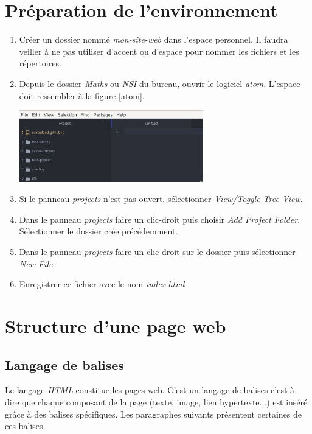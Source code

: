 \documentclass[a4paper,11pt]{article}
\begin{document}
\begin{Form}
\section{Préparation de l'environnement}
\begin{activite}
\begin{enumerate}
\item Créer un dossier nommé \emph{mon-site-web} dans l'espace personnel. Il faudra veiller à ne pas utiliser d'accent ou d'espace pour nommer les fichiers et les répertoires.
\item Depuis le dossier \emph{Maths} ou \emph{NSI} du bureau, ouvrir le logiciel \emph{atom}. L'espace doit ressembler à la figure \ref{atom}.
\begin{center}
\includegraphics[width=8cm]{ressources/atom.png}
\label{atom}
\end{center}
\item Si le panneau \emph{projects} n'est pas ouvert, sélectionner \emph{View/Toggle Tree View}.
\item Dans le panneau \emph{projects} faire un clic-droit puis choisir \emph{Add Project Folder}. Sélectionner le dossier crée précédemment.
\item Dans le panneau \emph{projects} faire un clic-droit sur le dossier puis sélectionner \emph{New File}.
\item Enregistrer ce fichier avec le nom \emph{index.html}
\end{enumerate}
\end{activite}

\section{Structure d'une page web}
\subsection{Langage de balises}
Le langage \emph{HTML} constitue les pages web. C'est un langage de balises c'est à dire que chaque composant de la page (texte, image, lien hypertexte...) est inséré grâce à des balises spécifiques. Les paragraphes suivants présentent certaines de ces balises.

\end{Form}
\end{document}
